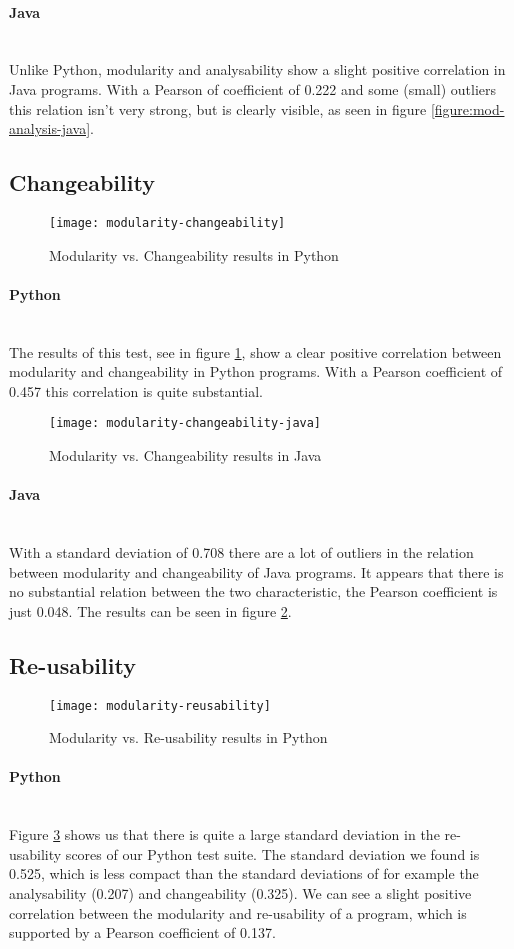 \documentclass[twoside]{uva-inf-bachelor-thesis}
\newcommand{\myparagraph}[1]{\paragraph{#1}\mbox{}\\}
\begin{document}
\myparagraph{Java}
Unlike Python, modularity and analysability show a slight positive correlation in Java programs. With a Pearson of coefficient of 0.222 and some (small) outliers this relation isn't very strong, but is clearly visible, as seen in figure \ref{figure:mod-analysis-java}.

\subsection{Changeability}

\begin{figure}[H]
    \caption{Modularity vs. Changeability results in Python}
    \label{figure:mod-change}
    \centering
        \texttt{[image: modularity-changeability]}
\end{figure}

\myparagraph{Python}
The results of this test, see in figure \ref{figure:mod-change}, show a clear positive correlation between modularity and changeability in Python programs. With a Pearson coefficient of 0.457 this correlation is quite substantial.

\begin{figure}[H]
    \caption{Modularity vs. Changeability results in Java}
    \label{figure:mod-change-java}
    \centering
        \texttt{[image: modularity-changeability-java]}
\end{figure}

\myparagraph{Java}
With a standard deviation of 0.708 there are a lot of outliers in the relation between modularity and changeability of Java programs. It appears that there is no substantial relation between the two characteristic, the Pearson coefficient is just 0.048. The results can be seen in figure \ref{figure:mod-change-java}.

\subsection{Re-usability}

\begin{figure}[H]
    \caption{Modularity vs. Re-usability results in Python}
    \label{figure:mod-reuse}
    \centering
        \texttt{[image: modularity-reusability]}
\end{figure}

\myparagraph{Python}
Figure \ref{figure:mod-reuse} shows us that there is quite a large standard deviation in the re-usability scores of our Python test suite. The standard deviation we found is 0.525, which is less compact than the standard deviations of for example the analysability (0.207) and changeability (0.325). We can see a slight positive correlation between the modularity and re-usability of a program, which is supported by a Pearson coefficient of 0.137.
\end{document}
